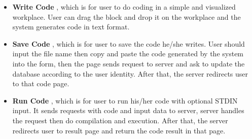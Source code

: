 \begin{itemize}

\item
\textbf{Write Code}
, which is for user to do coding in a simple and visualized workplace. User can drag the block and drop it on the workplace and the system generates code in text format.\newline

\item
\textbf{Save Code}
, which is for user to save the code he/she writes. User should input the file name then copy and paste the code generated by the system into the form, then the page sends request to server and ask to update the database according to the user identity. After that, the server redirects user to that code page.

\item
\textbf{Run Code}
, which is for user to run his/her code with optional STDIN input. It sends requests with code and input data to server, server handles the request then do compilation and execution. After that, the server redirects user to result page and return the code result in that page.

\end{itemize}